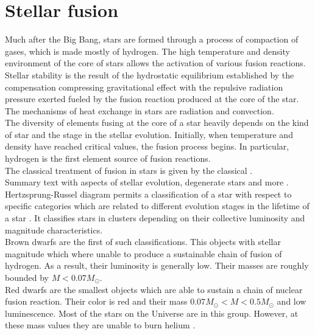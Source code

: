 \documentclass[openany]{book}
\begin{document}
\section{Stellar fusion}  \label{sec:StellarFusion}

Much after the Big Bang, stars are formed through a process of compaction of gases, which is made mostly of hydrogen. The high temperature and density environment of the core of stars allows the activation of various fusion reactions.  \\

Stellar stability is the result of the hydrostatic equilibrium established by the compensation compressing gravitational effect with the repulsive radiation pressure exerted fueled by the fusion reaction produced at the core of the star. The mechanisms of heat exchange in stars are radiation and convection. \\

The diversity of elements fusing at the core of a star heavily depends on the kind of star and the stage in the stellar evolution.  Initially, when temperature and density have reached critical values, the fusion process begins. In particular, hydrogen is the first element source of fusion reactions. \\

The classical treatment of fusion in stars is given by the classical \cite{burbidge_burbidge_fowler_hoyle_1957}. \\

Summary text with aspects of stellar evolution, degenerate stars and more \cite{kundt_2005}. \\

Hertzsprung-Russel diagram permits a classification of a star with respect to specific categories which are related to different evolution stages in the lifetime of a star \cite{arsentieva_shevchenko_2021}. It classifies stars in clusters depending on their collective luminosity and magnitude characteristics. \\

Brown dwarfs are the first of such classifications. This objects with stellar magnitude which where unable to produce a sustainable chain of fusion of hydrogen. As a result, their luminosity is generally low. Their masses are roughly bounded by $M < 0.07M_{\odot}$. \\

Red dwarfs are the smallest objects which are able to sustain a chain of nuclear fusion reaction. Their color is red and their mass $ 0.07M_{\odot} < M < 0.5 M_{\odot} $ and low luminescence. Most of the stars on the Universe are in this group. However, at these mass values they are unable to burn helium \cite{kundt_2005}. \\
\end{document}
